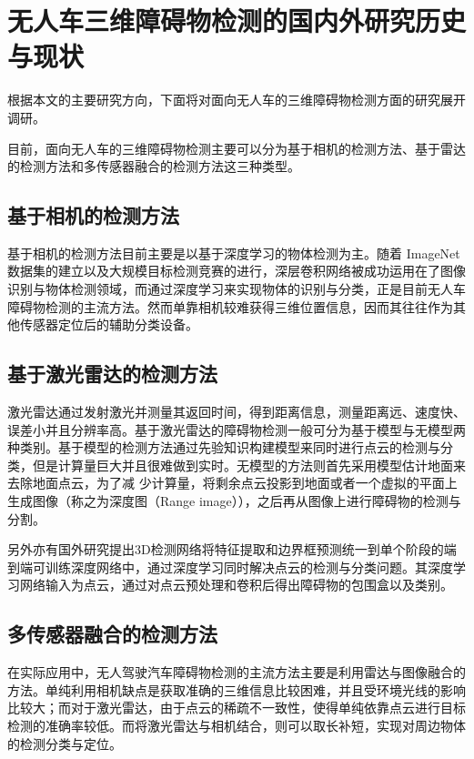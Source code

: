 \section{无人车三维障碍物检测的国内外研究历史与现状}
根据本文的主要研究方向，下面将对面向无人车的三维障碍物检测方面的研究展开调研。

目前，面向无人车的三维障碍物检测主要可以分为基于相机的检测方法、基于雷达的检测方法和多传感器融合的检测方法这三种类型。
\subsection{基于相机的检测方法}
基于相机的检测方法目前主要是以基于深度学习的物体检测为主。随着 ImageNet数据集的建立以及大规模目标检测竞赛的进行，深层卷积网络被成功运用在了图像识别与物体检测领域，而通过深度学习来实现物体的识别与分类，正是目前无人车障碍物检测的主流方法。然而单靠相机较难获得三维位置信息，因而其往往作为其他传感器定位后的辅助分类设备。
\subsection{基于激光雷达的检测方法}
激光雷达通过发射激光并测量其返回时间，得到距离信息，测量距离远、速度快、误差小并且分辨率高。基于激光雷达的障碍物检测一般可分为基于模型与无模型两种类别。基于模型的检测方法通过先验知识构建模型来同时进行点云的检测与分类，但是计算量巨大并且很难做到实时。无模型的方法则首先采用模型估计地面来去除地面点云，为了减 少计算量，将剩余点云投影到地面或者一个虚拟的平面上生成图像（称之为深度图（Range image）），之后再从图像上进行障碍物的检测与分割。

另外亦有国外研究提出3D检测网络将特征提取和边界框预测统一到单个阶段的端到端可训练深度网络中，通过深度学习同时解决点云的检测与分类问题。其深度学习网络输入为点云，通过对点云预处理和卷积后得出障碍物的包围盒以及类别。

\subsection{多传感器融合的检测方法}
在实际应用中，无人驾驶汽车障碍物检测的主流方法主要是利用雷达与图像融合的方法。单纯利用相机缺点是获取准确的三维信息比较困难，并且受环境光线的影响比较大；而对于激光雷达，由于点云的稀疏不一致性，使得单纯依靠点云进行目标检测的准确率较低。而将激光雷达与相机结合，则可以取长补短，实现对周边物体的检测分类与定位。

